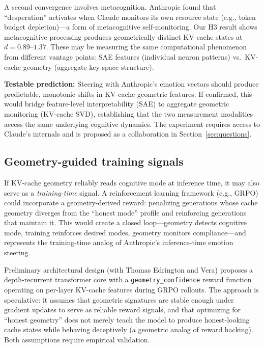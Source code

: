 \documentclass[11pt,letterpaper]{article}
\newcommand{\kvcache}{KV-cache\xspace}
\begin{document}
A second convergence involves metacognition.
Anthropic found that ``desperation'' activates when Claude monitors its own resource state (e.g., token budget depletion)---a form of metacognitive self-monitoring.
Our H3 result shows metacognitive processing produces geometrically distinct \kvcache states at $d = 0.89$--$1.37$.
These may be measuring the same computational phenomenon from different vantage points: SAE features (individual neuron patterns) vs.\ \kvcache geometry (aggregate key-space structure).

\textbf{Testable prediction:} Steering with Anthropic's emotion vectors should produce predictable, monotonic shifts in \kvcache geometric features.
If confirmed, this would bridge feature-level interpretability (SAE) to aggregate geometric monitoring (\kvcache SVD), establishing that the two measurement modalities access the same underlying cognitive dynamics.
The experiment requires access to Claude's internals and is proposed as a collaboration in Section~\ref{sec:questions}.

\subsection{Geometry-guided training signals}

If \kvcache geometry reliably reads cognitive mode at inference time, it may also serve as a \emph{training-time} signal.
A reinforcement learning framework (e.g., GRPO) could incorporate a geometry-derived reward: penalizing generations whose cache geometry diverges from the ``honest mode'' profile and reinforcing generations that maintain it.
This would create a closed loop---geometry detects cognitive mode, training reinforces desired modes, geometry monitors compliance---and represents the training-time analog of Anthropic's inference-time emotion steering.

Preliminary architectural design (with Thomas Edrington and Vera) proposes a depth-recurrent transformer core with a \texttt{geometry\_confidence} reward function operating on per-layer \kvcache features during GRPO rollouts.
The approach is speculative: it assumes that geometric signatures are stable enough under gradient updates to serve as reliable reward signals, and that optimizing for ``honest geometry'' does not merely teach the model to produce honest-looking cache states while behaving deceptively (a geometric analog of reward hacking).
Both assumptions require empirical validation.

\end{document}
